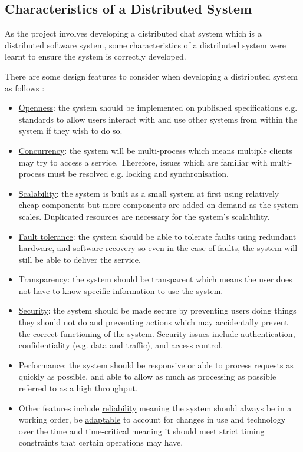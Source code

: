 \documentclass{article}
\begin{document}
\subsection{Characteristics of a Distributed System}
As the project involves developing a distributed chat system which is a distributed software system, some characteristics of a distributed system were learnt to ensure the system is correctly developed. \par
There are some design features to consider when developing a distributed system as follows \cite{DS-Concepts}: \par
\begin{itemize}
    \item \underline{Openness}: the system should be implemented on published specifications e.g. standards to allow users interact with and use other systems from within the system if they wish to do so. 
    \item \underline{Concurrency}: the system will be multi-process which means multiple clients may try to access a service. Therefore, issues which are familiar with multi-process must be resolved e.g. locking and synchronisation. 
    \item \underline{Scalability}: the system is built as a small system at first using relatively cheap components but more components are added on demand as the system scales. Duplicated resources are necessary for the system’s scalability. 
    \item \underline{Fault tolerance}: the system should be able to tolerate faults using redundant hardware, and software recovery so even in the case of faults, the system will still be able to deliver the service. 
    \item \underline{Transparency}: the system should be transparent which means the user does not have to know specific information to use the system. 
    \item \underline{Security}: the system should be made secure by preventing users doing things they should not do and preventing actions which may accidentally prevent the correct functioning of the system. Security issues include authentication, confidentiality (e.g. data and traffic), and access control. 
    \item \underline{Performance}: the system should be responsive or able to process requests as quickly as possible, and able to allow as much as processing as possible referred to as a high throughput. 
    \item Other features include \underline{reliability} meaning the system should always be in a working order, be \underline{adaptable} to account for changes in use and technology over the time and \underline{time-critical} meaning it should meet strict timing constraints that certain operations may have. 
\end{itemize}
\end{document}
